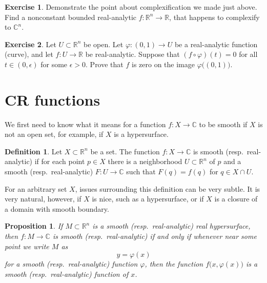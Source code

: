 \documentclass[12pt,openany]{book}
\newcommand{\C}{{\mathbb{C}}}
\newcommand{\R}{{\mathbb{R}}}
\theoremstyle{plain}
\newtheorem{prop}[thm]{Proposition}
\theoremstyle{remark}
\theoremstyle{definition}
\newtheorem{defn}[thm]{Definition}
\newenvironment{exbox}{%
    \def\FrameCommand{\vrule width 1pt \relax\hspace {10pt}}%
    \MakeFramed {\advance \hsize -\width \FrameRestore }%
}{%
    \endMakeFramed
}
\theoremstyle{exercise}
\newtheorem{exercise}{Exercise}[section]
\theoremstyle{example}
\begin{document}
\begin{exbox}
\begin{exercise}
Demonstrate the point about complexification we made just above.
Find a nonconstant bounded real-analytic $f \colon \R^n \to \R$,
that happens to complexify to $\C^n$.
\end{exercise}

\begin{exercise}
Let $U \subset \R^n$ be open.  Let $\varphi \colon (0,1) \to U$ be a
real-analytic function (curve), and let $f \colon U \to \R$ be
real-analytic.  Suppose that $(f \circ \varphi)(t) = 0$ for all $t \in
(0,\epsilon)$ for some $\epsilon > 0$.  Prove that $f$ is zero on the
image $\varphi\bigl((0,1)\bigr)$.
\end{exercise}
\end{exbox}


\section{CR functions}

We first need to know what it means for a function $f \colon X \to \C$
to be smooth if $X$ is not an open set, for example, if $X$ is a hypersurface.

\begin{defn}
Let $X \subset \R^n$ be a set.
The function $f \colon X \to \C$ is smooth (resp.\
real-analytic) if for each point $p \in X$ there is a
neighborhood $U \subset \R^n$ of $p$ and a smooth (resp.\ real-analytic) $F
\colon U \to \C$ such that $F(q) = f(q)$ for $q \in X \cap U$.
\end{defn}

For an arbitrary set $X$, issues surrounding this definition can be very subtle.  It
is very natural, however, if $X$ is nice, such as a hypersurface, or if $X$ is
a closure of a domain with smooth boundary.

\begin{prop}
If $M \subset \R^n$ is a smooth (resp.\ real-analytic) real hypersurface, then $f \colon M \to \C$
is smooth (resp.\ real-analytic) if and only if whenever near some point we write $M$
as
\begin{equation*}
y = \varphi(x)
\end{equation*}
for a smooth (resp.\ real-analytic) function $\varphi$, then
the function $f\bigl(x,\varphi(x)\bigr)$ is a smooth (resp.\ real-analytic) function of $x$.
\end{prop}
\end{document}
